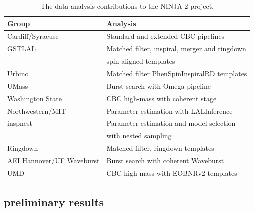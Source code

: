 %
\begin{table}
\begin{center}
\begin{tabular}{|l|l|}\hline
Group & Analysis \\\hline
Cardiff/Syracuse & Standard and extended CBC pipelines \\
GSTLAL & Matched filter, inspiral, merger and ringdown \\
 & spin-aligned templates \\
Urbino & Matched filter PhenSpinInspiralRD templates \\
UMass & Burst search with Omega pipeline \\
Washington State & CBC high-mass with coherent stage \\
Northwestern/MIT & Parameter estimation with LALInference \\
inspnest & Parameter estimation and model selection \\
 & with nested sampling \\
Ringdown & Matched filter, ringdown templates \\
AEI Hannover/UF Waveburst & Burst search with coherent Waveburst \\
UMD & CBC high-mass with EOBNRv2 templates \\
\hline
\end{tabular}
\end{center}
\caption[The data-analysis contributions to the NINJA-2 project.]{
\label{tab:ninja2-allda}
The data-analysis contributions to the NINJA-2 project.}
\end{table}

\subsection{preliminary results}



